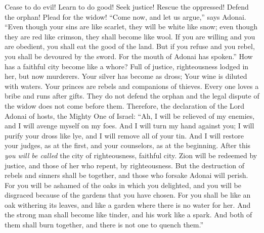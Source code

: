 \begin{biblechapter}
Cease to do evil!
\verse Learn to do good! 
Seek justice! Rescue the oppressed! 
Defend the orphan! Plead for the widow!
\verse “Come now, and let us argue,” says Adonai. 
“Even though your sins are like scarlet, they will be white like snow; 
even though they are red like crimson, they shall become like wool.
\verse If you are willing and you are obedient, 
you shall eat the good of the land.
\verse But if you refuse and you rebel, you shall be devoured by the sword. For the mouth of Adonai has spoken.”
 How has a faithful city become like a whore? 
Full of justice, righteousness lodged in her, but now murderers.
\verse Your silver has become as dross; 
Your wine is diluted with waters.
\verse Your princes are rebels 
and companions of thieves. 
Every one loves a bribe 
and runs after gifts. 
They do not defend the orphan 
and the legal dispute of the widow does not come before them.
\verse Therefore, the declaration of the Lord Adonai of hosts, the Mighty One of Israel: 
“Ah, I will be relieved of my enemies, 
and I will avenge myself on my foes.
\verse And I will turn my hand against you; 
I will purify your dross like lye, 
and I will remove all of your tin.
\verse And I will restore your judges, as at the first, 
and your counselors, as at the beginning. 
After this \textit{you will be called} the city of righteousness, 
faithful city.
\verse Zion will be redeemed by justice, 
and those of her who repent, by righteousness.
\verse But the destruction of rebels and sinners shall be together, 
and those who forsake Adonai will perish.
\verse For you will be ashamed of the oaks in which you delighted, 
and you will be disgraced because of the gardens that you have chosen.
\verse For you shall be like an oak withering its leaves, 
and like a garden where there is no water for her.
\verse And the strong man shall become like tinder, 
and his work like a spark. 
And both of them shall burn together, 
and there is not one to quench them.”
\end{biblechapter}

